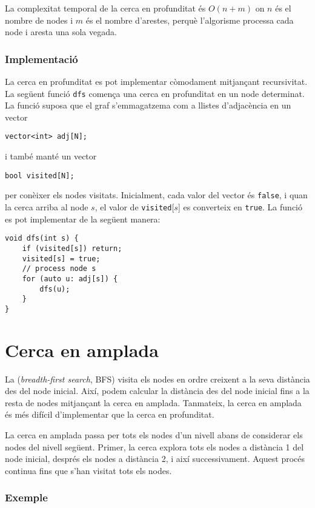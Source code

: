 La complexitat temporal de la cerca en profunditat és $O(n+m)$ on $n$
és el nombre de nodes i $m$ és el nombre d'arestes, perquè l'algorisme
processa cada node i aresta una sola vegada.

\subsubsection*{Implementació}

La cerca en profunditat es pot implementar còmodament mitjançant
recursivitat. La següent funció \texttt{dfs} comença una cerca en
profunditat en un node determinat. La funció suposa que el graf
s'emmagatzema com a llistes d'adjacència en un vector
\begin{lstlisting}
vector<int> adj[N];
\end{lstlisting}
i també manté un vector
\begin{lstlisting}
bool visited[N];
\end{lstlisting}
per conèixer els nodes visitats. Inicialment, cada valor del vector és
\texttt{false}, i quan la cerca arriba al node $s$, el valor de
\texttt{visited}[$s$] es converteix en \texttt{true}. La funció es pot
implementar de la següent manera:
\begin{lstlisting}
void dfs(int s) {
    if (visited[s]) return;
    visited[s] = true;
    // process node s
    for (auto u: adj[s]) {
        dfs(u);
    }
}
\end{lstlisting}


\section{Cerca en amplada}


La  (\emph{breadth-first search}, BFS) visita
els nodes en ordre creixent a la seva distància des del node
inicial. Així, podem calcular la distància des del node inicial fins a
la resta de nodes mitjançant la cerca en amplada. Tanmateix, la cerca
en amplada és més difícil d'implementar que la cerca en profunditat.

La cerca en amplada passa per tots els nodes d'un nivell abans de
considerar els nodes del nivell següent. Primer, la cerca explora tots
els nodes a distància 1 del node inicial, després els nodes a
distància 2, i així successivament. Aquest procés continua fins que
s'han visitat tots els nodes.

\subsubsection*{Exemple}

